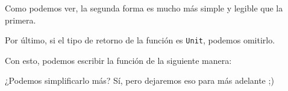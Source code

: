 
      Como podemos ver, la segunda forma es mucho más simple y legible que la primera.

      Por último, si el tipo de retorno de la función es \texttt{Unit}, podemos omitirlo.

      Con esto, podemos escribir la función de la siguiente manera:


      ¿Podemos simplificarlo más?
      Sí, pero dejaremos eso para más adelante ;)